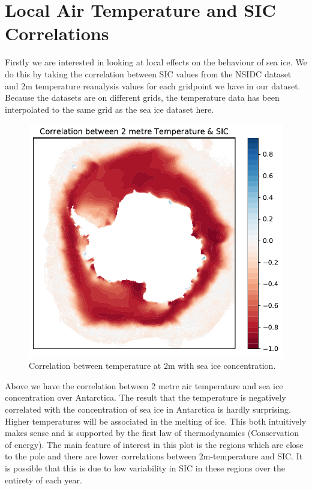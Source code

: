 \section{Local Air Temperature and SIC Correlations}
Firstly we are interested in looking at local effects on the behaviour of sea ice. We do this by taking the correlation between SIC values from the NSIDC dataset and 2m temperature reanalysis values for each gridpoint we have in our dataset. Because the datasets are on different grids, the temperature data has been interpolated to the same grid as the sea ice dataset here.
\begin{figure}[H]
    \centering
    \includegraphics{Images/tempcorrwithsic.pdf}
    \caption{Correlation between temperature at 2m with sea ice concentration.}
    \label{fig:results:2mtemp_corr_with_sic}
\end{figure}

Above we have the correlation between 2 metre air temperature and sea ice concentration over Antarctica. The result that the temperature is negatively correlated with the concentration of sea ice in Antarctica is hardly surprising. Higher temperatures will be associated in the melting of ice. This both intuitively makes sense and is supported by the first law of thermodynamics (Conservation of energy). The main feature of interest in this plot is the regions which are close to the pole and there are lower correlations between 2m-temperature and SIC. It is possible that this is due to low variability in SIC in these regions over the entirety of each year.

